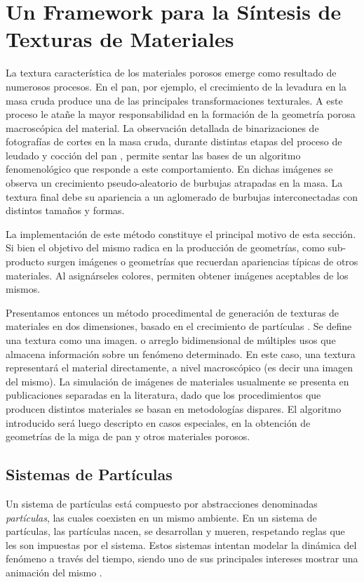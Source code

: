 \section[Síntesis de Texturas de Materiales]{Un Framework para la Síntesis de Texturas de Materiales}

La textura característica de los materiales porosos emerge como resultado de numerosos procesos.
En el pan, por ejemplo, el crecimiento de la levadura en la masa cruda produce una de las principales transformaciones texturales.
A este proceso le atañe la mayor responsabilidad en la formación de la geometría porosa macroscópica del material.
La observación detallada de binarizaciones de fotografías de cortes en la masa cruda, durante distintas etapas del proceso de leudado y cocción del pan \cite{Scanlon2001}, permite sentar las bases de un algoritmo fenomenológico que responde a este comportamiento.
En dichas imágenes se observa un crecimiento pseudo-aleatorio de burbujas atrapadas en la masa.
La textura final debe su apariencia a un aglomerado de burbujas interconectadas con distintos tamaños y formas.

La implementación de este método constituye el principal motivo de esta sección.
Si bien el objetivo del mismo radica en la producción de geometrías, como sub-producto surgen imágenes o geometrías que recuerdan apariencias típicas de otros materiales.
Al asignárseles colores, permiten obtener imágenes aceptables de los mismos.

Presentamos entonces un método procedimental de generación de texturas de materiales en dos dimensiones, basado en el crecimiento de partículas \cite{Reeves1983}.
Se define una textura como una imagen. o arreglo bidimensional de múltiples usos que almacena información sobre un fenómeno determinado.
En este caso, una textura representará el material directamente, a nivel macroscópico (es decir una imagen del mismo).
La simulación de imágenes de materiales usualmente se presenta en publicaciones separadas en la literatura, dado que los procedimientos que producen distintos materiales se basan en metodologías dispares.
El algoritmo introducido será luego descripto en casos especiales, en la obtención de geometrías de la miga de pan y otros materiales porosos.

\subsection{Sistemas de Partículas}
Un sistema de partículas está compuesto por abstracciones denominadas {\em partículas}, las cuales coexisten en un mismo ambiente.
En un sistema de part\'iculas, las part\'iculas nacen, se desarrollan y mueren, respetando reglas que les son impuestas por el sistema. Estos sistemas intentan modelar la din\'amica del fen\'omeno a trav\'es del tiempo, siendo uno de sus principales intereses mostrar una animaci\'on del mismo \cite{Gao2010, Bagar2010, Lentine2010}.

